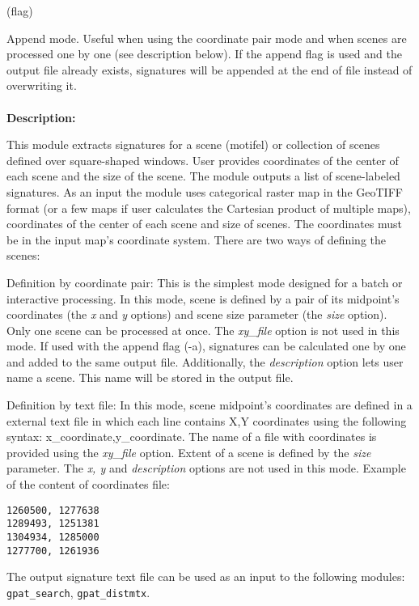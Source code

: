  (flag)

Append mode. 
Useful when using the coordinate pair mode and when scenes are processed one by one (see description below). 
If the append flag is used and the output file already exists, signatures will be appended at the end of file instead of overwriting it.
\\\\
{\bf Description:}

This module extracts signatures for a scene (motifel) or collection of scenes defined over square-shaped windows.
User provides coordinates of the center of each scene and the size of the scene. 
The module outputs a list of scene-labeled signatures.
As an input the module uses categorical raster map in the GeoTIFF format (or a few maps if user calculates the Cartesian product of multiple maps), coordinates of the center of each scene and size of scenes. 
The coordinates must be in the input map's coordinate system. 
There are two ways of defining the scenes:

Definition by coordinate pair: 
This is the simplest mode designed for a batch or interactive processing. 
In this mode, scene is defined by a pair of its midpoint's coordinates (the {\it x} and {\it y} options) and scene size parameter (the {\it size} option). 
Only one scene can be processed at once. 
The {\it xy\_file} option is not used in this mode.
If used with the append flag (-a), signatures can be calculated one by one and added to the same output file. 
Additionally, the {\it description} option lets user name a scene. 
This name will be stored in the output file.

Definition by text file:
In this mode, scene midpoint's coordinates are defined in a external text file in which each line contains X,Y coordinates using the following syntax: x\_coordinate,y\_coordinate.
The name of a file with coordinates is provided using the {\it xy\_file} option. 
Extent of a scene is defined by the {\it size} parameter. 
The {\it x, y} and {\it description} options are not used in this mode. 
Example of the content of coordinates file: 

\begin{minipage}{\linewidth}
\begin{lstlisting}
1260500, 1277638
1289493, 1251381
1304934, 1285000
1277700, 1261936
\end{lstlisting}
\end{minipage}

The output signature text file can be used as an input to the following modules: {\tt gpat\_search}, {\tt gpat\_distmtx}.

